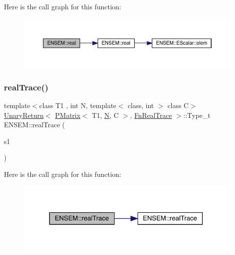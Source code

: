 Here is the call graph for this function\+:\nopagebreak
\begin{figure}[H]
\begin{center}
\leavevmode
\includegraphics[width=350pt]{df/d0a/group__primmatrix_ga5d6f44c46b47f8dc972b40a518058e0e_cgraph}
\end{center}
\end{figure}
\mbox{\label{group__primmatrix_gaf2db8b017f816bb958ba639899fa1cf7}} 
\subsubsection{\texorpdfstring{realTrace()}{realTrace()}}
{\footnotesize\ttfamily template$<$class T1 , int N, template$<$ class, int $>$ class C$>$ \\
\mbox{\hyperlink{structENSEM_1_1UnaryReturn}{Unary\+Return}}$<$ \mbox{\hyperlink{classENSEM_1_1PMatrix}{P\+Matrix}}$<$ T1, \mbox{\hyperlink{adat__devel_2lib_2hadron_2operator__name__util_8cc_a7722c8ecbb62d99aee7ce68b1752f337}{N}}, C $>$, \mbox{\hyperlink{structENSEM_1_1FnRealTrace}{Fn\+Real\+Trace}} $>$\+::Type\+\_\+t E\+N\+S\+E\+M\+::real\+Trace (\begin{DoxyParamCaption}\item[{const \mbox{\hyperlink{classENSEM_1_1PMatrix}{P\+Matrix}}$<$ T1, \mbox{\hyperlink{adat__devel_2lib_2hadron_2operator__name__util_8cc_a7722c8ecbb62d99aee7ce68b1752f337}{N}}, C $>$ \&}]{s1 }\end{DoxyParamCaption})\hspace{0.3cm}{\ttfamily [inline]}}

Here is the call graph for this function\+:\nopagebreak
\begin{figure}[H]
\begin{center}
\leavevmode
\includegraphics[width=314pt]{df/d0a/group__primmatrix_gaf2db8b017f816bb958ba639899fa1cf7_cgraph}
\end{center}
\end{figure}
\mbox{\label{group__primmatrix_ga9f1d3892badcfa2bf78d97c42c8a05e5}} 
